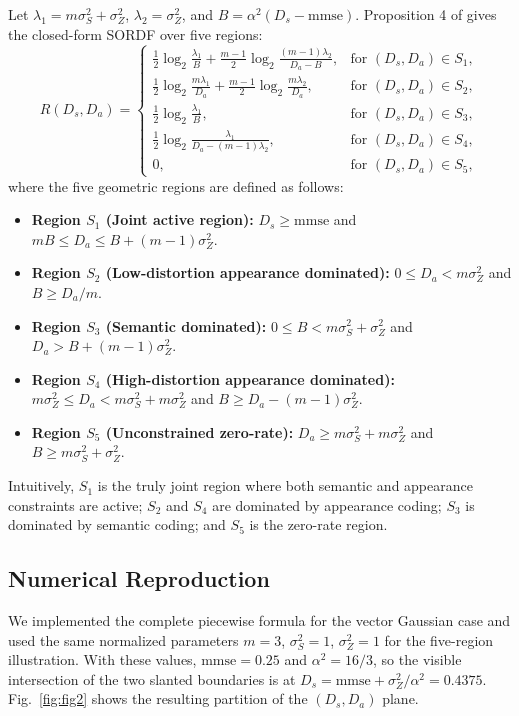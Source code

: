 \documentclass[conference]{IEEEtran}
\begin{document}
Let $\lambda_1=m\sigma_S^2+\sigma_Z^2$, $\lambda_2=\sigma_Z^2$, and $B=\alpha^2(D_s-\mathrm{mmse})$. Proposition 4 of \cite{liu2021rate} gives the closed-form SORDF over five regions:
\begin{equation}
R(D_s, D_a) = 
\begin{cases}
\frac{1}{2}\log_2\frac{\lambda_1}{B} + \frac{m-1}{2}\log_2\frac{(m-1)\lambda_2}{D_a-B}, & \text{for } (D_s, D_a) \in S_1, \\
\frac{1}{2}\log_2\frac{m\lambda_1}{D_a} + \frac{m-1}{2}\log_2\frac{m\lambda_2}{D_a}, & \text{for } (D_s, D_a) \in S_2, \\
\frac{1}{2}\log_2\frac{\lambda_1}{B}, & \text{for } (D_s, D_a) \in S_3, \\
\frac{1}{2}\log_2\frac{\lambda_1}{D_a-(m-1)\lambda_2}, & \text{for } (D_s, D_a) \in S_4, \\
0, & \text{for } (D_s, D_a) \in S_5,
\end{cases}
\label{eq:sordf_gaussian}
\end{equation}
where the five geometric regions are defined as follows:
\begin{itemize}
    \item \textbf{Region $S_1$ (Joint active region):} $D_s \ge \text{mmse}$ and $m B \le D_a \le B + (m-1)\sigma_Z^2$.
    \item \textbf{Region $S_2$ (Low-distortion appearance dominated):} $0 \le D_a < m\sigma_Z^2$ and $B \ge D_a / m$.
    \item \textbf{Region $S_3$ (Semantic dominated):} $0 \le B < m\sigma_S^2 + \sigma_Z^2$ and $D_a > B + (m-1)\sigma_Z^2$.
    \item \textbf{Region $S_4$ (High-distortion appearance dominated):} $m\sigma_Z^2 \le D_a < m\sigma_S^2 + m\sigma_Z^2$ and $B \ge D_a - (m-1)\sigma_Z^2$.
    \item \textbf{Region $S_5$ (Unconstrained zero-rate):} $D_a \ge m\sigma_S^2 + m\sigma_Z^2$ and $B \ge m\sigma_S^2 + \sigma_Z^2$.
\end{itemize}
Intuitively, $S_1$ is the truly joint region where both semantic and appearance constraints are active; $S_2$ and $S_4$ are dominated by appearance coding; $S_3$ is dominated by semantic coding; and $S_5$ is the zero-rate region.
\subsection{Numerical Reproduction}

We implemented the complete piecewise formula for the vector Gaussian case and used the same normalized parameters $m=3$, $\sigma_S^2=1$, $\sigma_Z^2=1$ for the five-region illustration. With these values, $\mathrm{mmse}=0.25$ and $\alpha^2=16/3$, so the visible intersection of the two slanted boundaries is at $D_s=\mathrm{mmse}+\sigma_Z^2/\alpha^2=0.4375$. Fig.~\ref{fig:fig2} shows the resulting partition of the $(D_s,D_a)$ plane.
\end{document}
